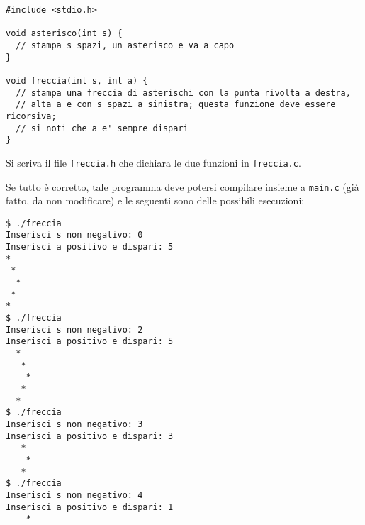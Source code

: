 \documentclass[12pt]{article}
\begin{document}
\begin{center}
  \begin{lstlisting}[language=myC]
#include <stdio.h>

void asterisco(int s) {
  // stampa s spazi, un asterisco e va a capo
}

void freccia(int s, int a) {
  // stampa una freccia di asterischi con la punta rivolta a destra,
  // alta a e con s spazi a sinistra; questa funzione deve essere ricorsiva;
  // si noti che a e' sempre dispari
}
  \end{lstlisting}
\end{center}

Si scriva il file \texttt{freccia.h} che dichiara le due funzioni in \texttt{freccia.c}.

Se tutto \`e corretto, tale programma deve potersi compilare insieme a \texttt{main.c}
(gi\`a fatto, da non modificare) e le seguenti sono  delle possibili esecuzioni:

\begin{mdframed}[backgroundcolor=lightgrey] 
\begin{verbatim}
$ ./freccia
Inserisci s non negativo: 0
Inserisci a positivo e dispari: 5
*
 *
  *
 *
*
$ ./freccia
Inserisci s non negativo: 2
Inserisci a positivo e dispari: 5
  *
   *
    *
   *
  *
$ ./freccia 
Inserisci s non negativo: 3
Inserisci a positivo e dispari: 3
   *
    *
   *
$ ./freccia
Inserisci s non negativo: 4
Inserisci a positivo e dispari: 1
    *
\end{verbatim}
\end{mdframed}
\end{document}
